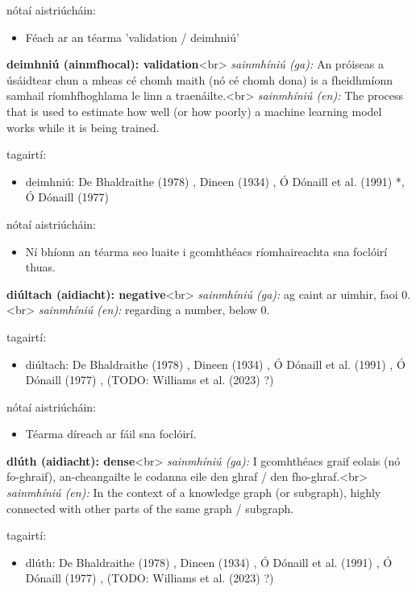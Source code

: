 \documentclass{article}
\begin{document}
nótaí aistriúcháin:
\begin{itemize}
	\item Féach ar an téarma 'validation / deimhniú'
\end{itemize}


\textbf{deimhniú (ainmfhocal): validation}<br>
\textit{sainmhíniú (ga):} An próiseas a úsáidtear chun a mheas cé chomh maith (nó cé chomh dona) is a fheidhmíonn samhail ríomhfhoghlama le linn a traenáilte.<br>
\textit{sainmhíniú (en):} The process that is used to estimate how well (or how poorly) a machine learning model works while it is being trained.

tagairtí:
\begin{itemize}
	\item deimhniú: De Bhaldraithe (1978) \cite{de-bhaldraithe}, Dineen (1934) \cite{dineen}, Ó Dónaill et al. (1991) \cite{focloir-beag}*, Ó Dónaill (1977) \cite{odonaill}
\end{itemize}

nótaí aistriúcháin:
\begin{itemize}
	\item Ní bhíonn an téarma seo luaite i gcomhthéacs ríomhaireachta sna foclóirí thuas.
\end{itemize}


\textbf{diúltach (aidiacht): negative}<br>
\textit{sainmhíniú (ga):} ag caint ar uimhir, faoi 0.<br>
\textit{sainmhíniú (en):} regarding a number, below 0.

tagairtí:
\begin{itemize}
	\item diúltach: De Bhaldraithe (1978) \cite{de-bhaldraithe}, Dineen (1934) \cite{dineen}, Ó Dónaill et al. (1991) \cite{focloir-beag}, Ó Dónaill (1977) \cite{odonaill}, (TODO: Williams et al. (2023) \cite{storchiste}?)
\end{itemize}

nótaí aistriúcháin:
\begin{itemize}
	\item Téarma díreach ar fáil sna foclóirí.
\end{itemize}


\textbf{dlúth (aidiacht): dense}<br>
\textit{sainmhíniú (ga):} I gcomhthéacs graif eolais (nó fo-ghraif), an-cheangailte le codanna eile den ghraf / den fho-ghraf.<br>
\textit{sainmhíniú (en):} In the context of a knowledge graph (or subgraph), highly connected with other parts of the same graph / subgraph.

tagairtí:
\begin{itemize}
	\item dlúth: De Bhaldraithe (1978) \cite{de-bhaldraithe}, Dineen (1934) \cite{dineen}, Ó Dónaill et al. (1991) \cite{focloir-beag}, Ó Dónaill (1977) \cite{odonaill}, (TODO: Williams et al. (2023) \cite{storchiste}?)
\end{itemize}
\end{document}
